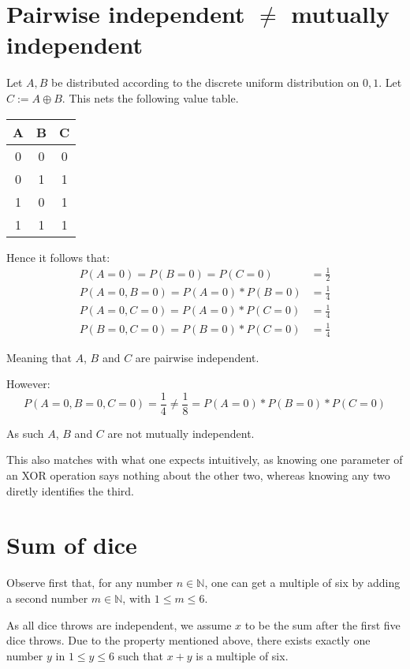 \documentclass[a4paper]{scrreprt}
\begin{document}
\section{Pairwise independent $\neq$ mutually independent}

Let $A, B$ be distributed according to the discrete uniform distribution on
${0, 1}$. Let $C := A \oplus B$. This nets the following value table.
\\

\begin{tabular}{|c|c|c|}
	\hline
	A & B & C \\
	\hline
	0 & 0 & 0 \\
	\hline
	0 & 1 & 1 \\
	\hline
	1 & 0 & 1 \\
	\hline
	1 & 1 & 1 \\
	\hline
\end{tabular}

Hence it follows that:
\begin{align*}
	P(A=0) = P(B=0) = P(C=0) & = \frac{1}{2} \\
	P(A=0, B=0) = P(A=0) * P(B=0) & = \frac{1}{4} \\
	P(A=0, C=0) = P(A=0) * P(C=0) & = \frac{1}{4} \\
	P(B=0, C=0) = P(B=0) * P(C=0) & = \frac{1}{4}
\end{align*}

Meaning that $A$, $B$ and $C$ are pairwise independent. 

However:
\[
	P(A=0, B=0, C=0) = \frac{1}{4} \neq \frac{1}{8} = P(A=0) * P(B=0) * P(C=0)
\]

As such $A$, $B$ and $C$ are not mutually independent.

This also matches with what one expects intuitively, as knowing one parameter
of an XOR operation says nothing about the other two, whereas knowing any two
diretly identifies the third.

\section{Sum of dice}

Observe first that, for any number $n \in \mathbb{N}$, one can get a multiple
of six by adding a second number $m \in \mathbb{N}$, with $1 \leq m \leq 6$.

As all dice throws are independent, we assume $x$ to be the sum after the first
five dice throws. Due to the property mentioned above, there exists exactly one
number $y$ in $1 \leq y \leq 6$ such that $x + y$ is a multiple of six.
\end{document}
